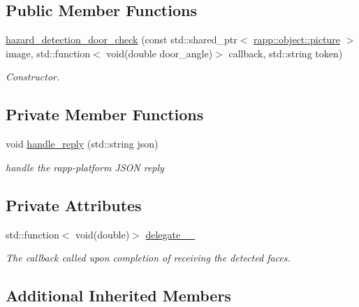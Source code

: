 \subsection*{Public Member Functions}
\begin{DoxyCompactItemize}
\item 
\hyperlink{classrapp_1_1cloud_1_1hazard__detection__door__check_a063fd492da15958eda11d72fb95c76f0}{hazard\-\_\-detection\-\_\-door\-\_\-check} (const std\-::shared\-\_\-ptr$<$ \hyperlink{classrapp_1_1object_1_1picture}{rapp\-::object\-::picture} $>$ image, std\-::function$<$ void(double door\-\_\-angle)$>$ callback, std\-::string token)
\begin{DoxyCompactList}\small\item\em Constructor. \end{DoxyCompactList}\end{DoxyCompactItemize}
\subsection*{Private Member Functions}
\begin{DoxyCompactItemize}
\item 
void \hyperlink{classrapp_1_1cloud_1_1hazard__detection__door__check_a8113d3e9a1f6839aa014fd52ee6535bd}{handle\-\_\-reply} (std\-::string json)
\begin{DoxyCompactList}\small\item\em handle the rapp-\/platform J\-S\-O\-N reply \end{DoxyCompactList}\end{DoxyCompactItemize}
\subsection*{Private Attributes}
\begin{DoxyCompactItemize}
\item 
std\-::function$<$ void(double)$>$ \hyperlink{classrapp_1_1cloud_1_1hazard__detection__door__check_a177ae21c6857e3e595e02128fb47247c}{delegate\-\_\-\-\_\-}
\begin{DoxyCompactList}\small\item\em The callback called upon completion of receiving the detected faces. \end{DoxyCompactList}\end{DoxyCompactItemize}
\subsection*{Additional Inherited Members}


